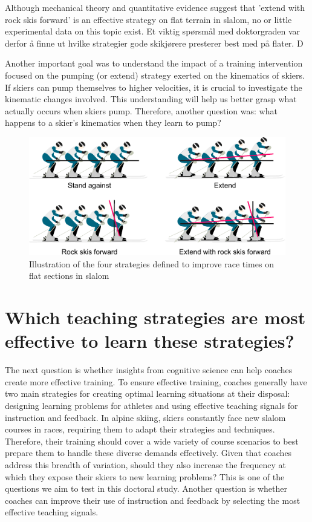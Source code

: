 Although mechanical theory and quantitative evidence suggest that 'extend with rock skis forward' is an effective strategy on flat terrain in slalom, no or little experimental data on this topic exist. Et viktig spørsmål med doktorgraden var derfor å finne ut hvilke strategier gode skikjørere presterer best med på flater. D


Another important goal was to understand the impact of a training intervention focused on the pumping (or extend) strategy exerted on the kinematics of skiers. If skiers can pump themselves to higher velocities, it is crucial to investigate the kinematic changes involved. This understanding will help us better grasp what actually occurs when skiers pump. Therefore, another question was: what happens to a skier's kinematics when they learn to pump?

\begin{figure}[H]
    \centering
    \includegraphics[width=1\linewidth]{figure/figure_introduction_strategies.pdf}
    \caption[Illustration of the four strategies we defined to improve race times on flat sections in slalom]{Illustration of the four strategies defined to improve race times on flat sections in slalom}
    \label{fig: strategies}
\end{figure}

\section{Which teaching strategies are most effective to learn these strategies?}
The next question is whether insights from cognitive science can help coaches create more effective training. To ensure effective training, coaches generally have two main strategies for creating optimal learning situations at their disposal: designing learning problems for athletes and using effective teaching signals for instruction and feedback. In alpine skiing, skiers constantly face new slalom courses in races, requiring them to adapt their strategies and techniques. Therefore, their training should cover a wide variety of course scenarios to best prepare them to handle these diverse demands effectively. Given that coaches address this breadth of variation, should they also increase the frequency at which they expose their skiers to new learning problems? This is one of the questions we aim to test in this doctoral study. Another question is whether coaches can improve their use of instruction and feedback by selecting the most effective teaching signals.


